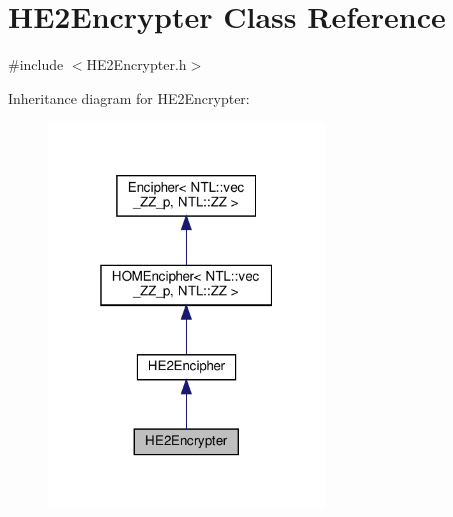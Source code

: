 \hypertarget{classHE2Encrypter}{}\section{H\+E2\+Encrypter Class Reference}
\label{classHE2Encrypter}


{\ttfamily \#include $<$H\+E2\+Encrypter.\+h$>$}



Inheritance diagram for H\+E2\+Encrypter\+:\nopagebreak
\begin{figure}[H]
\begin{center}
\leavevmode
\includegraphics[width=208pt]{classHE2Encrypter__inherit__graph}
\end{center}
\end{figure}


